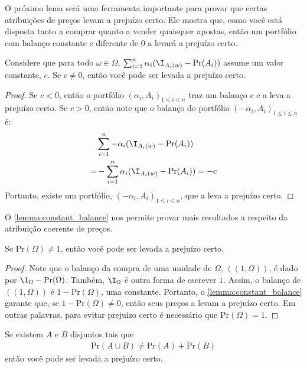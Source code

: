 O próximo lema será uma ferramenta importante
para provar que certas atribuições de preços
levam a prejuízo certo.
Ele mostra que, como você está disposta tanto
a comprar quanto a vender quaisquer apostas,
então um portfólio com balanço constante e
diferente de $0$ a levará a prejuízo certo.

\begin{lemma}
 \label{lemma:constant_balance}
 Considere que para todo $\omega \in \Omega$,
 $\sum_{i=1}^{n}{\alpha_{i}(\I_{A_{i}(w)}-\text{Pr}(A_{i}))}$
 assume um valor constante, $c$.
 Se $c \neq 0$, então você pode ser levada 
 a prejuízo certo.
\end{lemma}

\begin{proof}
 Se $c < 0$, então o portfólio
 $(\alpha_{i},A_{i})_{1 \leq i \leq n}$
 traz um balanço $c$ e a leva a prejuízo certo.
 Se $c > 0$, então note que 
 o balanço do portfólio 
 $(-\alpha_{i},A_{i})_{1 \leq i \leq n}$ é:
 \begin{align*}
  &\sum_{i=1}^{n}{-\alpha_{i}(\I_{A_{i}(w)}-\text{Pr}(A_{i}))} \\
  =&-\sum_{i=1}^{n}{\alpha_{i}(\I_{A_{i}(w)}-\text{Pr}(A_{i}))} = -c
 \end{align*}
 Portanto, existe um portfólio, 
 $(-\alpha_{i},A_{i})_{1 \leq i \leq n}$,
 que a leva a prejuízo certo.
\end{proof}

O \cref{lemma:constant_balance} nos permite provar
mais resultados a respeito da 
atribuição coerente de preços.

\begin{lemma}
 \label{lemma:sure_loss_2}
 Se $\text{Pr}(\Omega) \neq 1$,
 então você pode ser levada a prejuízo certo.
\end{lemma}

\begin{proof}
 Note que o balanço da compra de 
 uma unidade de $\Omega$, 
 $((1,\Omega))$, é dado por 
 $\I_{\Omega}-\text{Pr}(\Omega)$.
 Também, $\I_{\Omega}$ é outra forma de escrever $1$.
 Assim, o balanço de $((1,\Omega))$ é
 $1-\text{Pr}(\Omega)$, uma constante.
 Portanto, o \cref{lemma:constant_balance} garante que,
 se $1-\text{Pr}(\Omega) \neq 0$,
 então seus preços a levam a prejuízo certo.
 Em outras palavras, para evitar prejuízo certo
 é necessário que $\text{Pr}(\Omega) = 1$.
\end{proof}

\begin{lemma}
 \label{lemma:sure_loss_3}
 Se existem $A$ e $B$ disjuntos tais que
 \begin{align*}
  \text{Pr}(A \cup B) \neq \text{Pr}(A)+\text{Pr}(B)
 \end{align*}
 então você pode ser levada a prejuízo certo.
\end{lemma}

